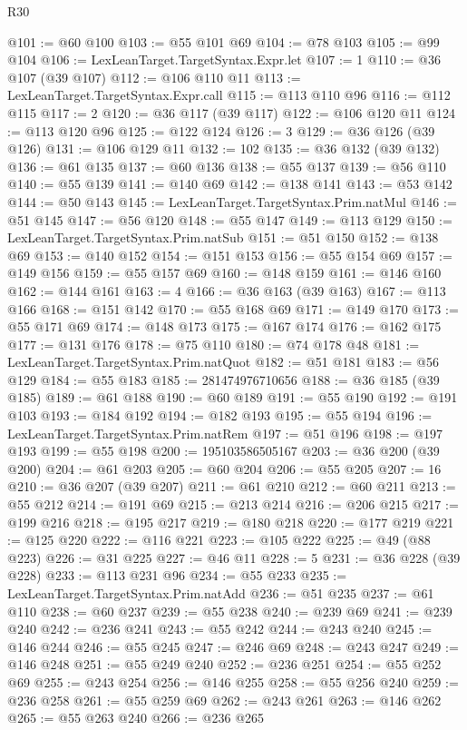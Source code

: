 \begin{lexlean}{R30}
\begin{coremodule}
@101 := @60 @100
@103 := @55 @101 @69
@104 := @78 @103
@105 := @99 @104
@106 := LexLeanTarget.TargetSyntax.Expr.let
@107 := 1
@110 := @36 @107 (@39 @107)
@112 := @106 @110 @11
@113 := LexLeanTarget.TargetSyntax.Expr.call
@115 := @113 @110 @96
@116 := @112 @115
@117 := 2
@120 := @36 @117 (@39 @117)
@122 := @106 @120 @11
@124 := @113 @120 @96
@125 := @122 @124
@126 := 3
@129 := @36 @126 (@39 @126)
@131 := @106 @129 @11
@132 := 102
@135 := @36 @132 (@39 @132)
@136 := @61 @135
@137 := @60 @136
@138 := @55 @137
@139 := @56 @110
@140 := @55 @139
@141 := @140 @69
@142 := @138 @141
@143 := @53 @142
@144 := @50 @143
@145 := LexLeanTarget.TargetSyntax.Prim.natMul
@146 := @51 @145
@147 := @56 @120
@148 := @55 @147
@149 := @113 @129
@150 := LexLeanTarget.TargetSyntax.Prim.natSub
@151 := @51 @150
@152 := @138 @69
@153 := @140 @152
@154 := @151 @153
@156 := @55 @154 @69
@157 := @149 @156
@159 := @55 @157 @69
@160 := @148 @159
@161 := @146 @160
@162 := @144 @161
@163 := 4
@166 := @36 @163 (@39 @163)
@167 := @113 @166
@168 := @151 @142
@170 := @55 @168 @69
@171 := @149 @170
@173 := @55 @171 @69
@174 := @148 @173
@175 := @167 @174
@176 := @162 @175
@177 := @131 @176
@178 := @75 @110
@180 := @74 @178 @48
@181 := LexLeanTarget.TargetSyntax.Prim.natQuot
@182 := @51 @181
@183 := @56 @129
@184 := @55 @183
@185 := 281474976710656
@188 := @36 @185 (@39 @185)
@189 := @61 @188
@190 := @60 @189
@191 := @55 @190
@192 := @191 @103
@193 := @184 @192
@194 := @182 @193
@195 := @55 @194
@196 := LexLeanTarget.TargetSyntax.Prim.natRem
@197 := @51 @196
@198 := @197 @193
@199 := @55 @198
@200 := 195103586505167
@203 := @36 @200 (@39 @200)
@204 := @61 @203
@205 := @60 @204
@206 := @55 @205
@207 := 16
@210 := @36 @207 (@39 @207)
@211 := @61 @210
@212 := @60 @211
@213 := @55 @212
@214 := @191 @69
@215 := @213 @214
@216 := @206 @215
@217 := @199 @216
@218 := @195 @217
@219 := @180 @218
@220 := @177 @219
@221 := @125 @220
@222 := @116 @221
@223 := @105 @222
@225 := @49 (@88 @223)
@226 := @31 @225
@227 := @46 @11
@228 := 5
@231 := @36 @228 (@39 @228)
@233 := @113 @231 @96
@234 := @55 @233
@235 := LexLeanTarget.TargetSyntax.Prim.natAdd
@236 := @51 @235
@237 := @61 @110
@238 := @60 @237
@239 := @55 @238
@240 := @239 @69
@241 := @239 @240
@242 := @236 @241
@243 := @55 @242
@244 := @243 @240
@245 := @146 @244
@246 := @55 @245
@247 := @246 @69
@248 := @243 @247
@249 := @146 @248
@251 := @55 @249 @240
@252 := @236 @251
@254 := @55 @252 @69
@255 := @243 @254
@256 := @146 @255
@258 := @55 @256 @240
@259 := @236 @258
@261 := @55 @259 @69
@262 := @243 @261
@263 := @146 @262
@265 := @55 @263 @240
@266 := @236 @265

\end{coremodule}
\end{lexlean}
